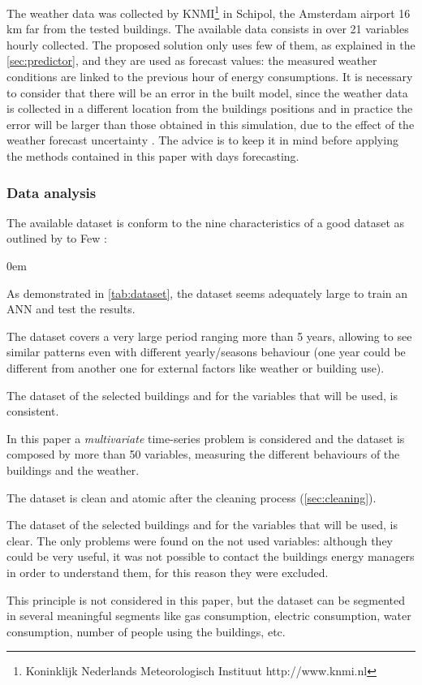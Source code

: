 \documentclass{sig-alternate-sigmod07}
\begin{document}
The weather data was collected by KNMI\footnote{Koninklijk Nederlands Meteorologisch Instituut http://www.knmi.nl} in Schipol, the Amsterdam airport 16 km far from the tested buildings. The available data consists in over 21 variables hourly collected. The proposed solution only uses few of them, as explained in the \cref{sec:predictor}, and they are used as forecast values: the measured weather conditions are linked to the previous hour of energy consumptions. It is necessary to consider that there will be an error in the built model, since the weather data is collected in a different location from the buildings positions and in practice the error will be larger than those obtained in this simulation, due to the effect of the weather forecast uncertainty \cite{douglas1998impacts, ranaweera1996effect}. The advice is to keep it in mind before applying the methods contained in this paper with days forecasting.


\subsubsection{Data analysis}
\label{sec:dataAnalysis}

The available dataset is conform to the nine characteristics of a good dataset as outlined by to Few \cite{few2009now}:
\begin{description}
\itemsep0em
  \item[Volume] As demonstrated in \cref{tab:dataset}, the dataset seems adequately large to train an ANN and test the results.
  \item[Historical] The dataset covers a very large period ranging more than 5 years, allowing to see similar patterns even with different yearly/seasons behaviour (one year could be different from another one for external factors like weather or building use). 
  \item[Consistent] The dataset of the selected buildings and for the variables that will be used, is consistent.
  \item[Multivariate] In this paper a \emph{multivariate} time-series problem is considered and the dataset is composed by more than 50 variables, measuring the different behaviours of the buildings and the weather.
\item[Clean-Atomic] The dataset is clean and atomic after the cleaning process (\cref{sec:cleaning}).
\item[Clear] The dataset of the selected buildings and for the variables that will be used, is clear. The only problems were found on the not used variables: although they could be very useful, it was not possible to contact the buildings energy managers in order to understand them, for this reason they were excluded.
\item[Richy Segmented] This principle is not considered in this paper, but the dataset can be segmented in several meaningful segments like gas consumption, electric consumption, water consumption, number of people using the buildings, etc.
\end{description}
\end{document}
